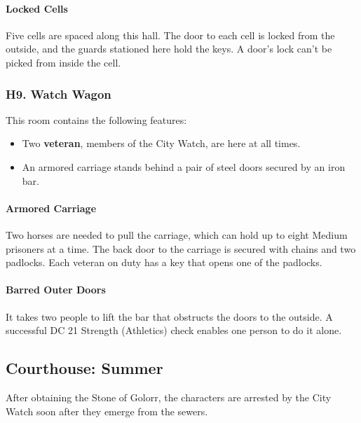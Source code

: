 \documentclass[10pt,a4paper,twoside,twocolumn,openany,nodeprecatedcode]{dndbook}
\begin{document}
\paragraph{Locked Cells}
Five cells are spaced along this hall. The door to each cell is locked from the outside, and the guards stationed here hold the keys. A door's lock can't be picked from inside the cell.
\subsubsection{H9. Watch Wagon}
This room contains the following features:
\begin{itemize}

\item Two \textbf{veteran}, members of the City Watch, are here at all times.
\item An armored carriage stands behind a pair of steel doors secured by an iron bar.
\end{itemize}


\paragraph{Armored Carriage}
Two horses are needed to pull the carriage, which can hold up to eight Medium prisoners at a time. The back door to the carriage is secured with chains and two padlocks. Each veteran on duty has a key that opens one of the padlocks.
\paragraph{Barred Outer Doors}
It takes two people to lift the bar that obstructs the doors to the outside. A successful DC 21 Strength (Athletics) check enables one person to do it alone.
\subsection{Courthouse: Summer}
After obtaining the Stone of Golorr, the characters are arrested by the City Watch soon after they emerge from the sewers.
\end{document}
